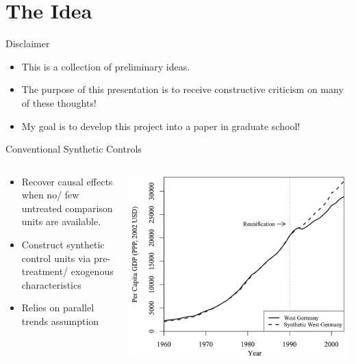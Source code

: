 \section{The Idea}
\begin{frame}{Disclaimer}
    \begin{itemize}
        \item{This is a collection of preliminary ideas.}
        \item{The purpose of this presentation is to receive constructive criticism on many of these thoughts!}
        \item{My goal is to develop this project into a paper in graduate school!}
    \end{itemize}
\end{frame}

\begin{frame}{Conventional Synthetic Controls}
  \begin{columns}
    \begin{column}{0.58\linewidth}
        \begin{itemize}
            \item{Recover causal effects when no/ few untreated comparison units are available.}
            \vspace{-7pt}
            \item{Construct synthetic control units via pre-treatment/ exogenous characteristics}
            \vspace{-7pt}
            \item{Relies on parallel trends assumption}
        \end{itemize}
    \end{column}
    \begin{column}{0.5\linewidth}
        \centering
        \includegraphics[scale = 0.3]{figures/fig.scmethod.png}\\
        \centering
    \end{column}
  \end{columns}
\end{frame}

